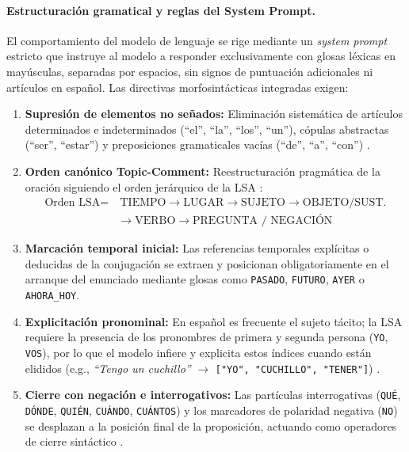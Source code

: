 \paragraph{Estructuración gramatical y reglas del System Prompt.}
El comportamiento del modelo de lenguaje se rige mediante un \textit{system prompt} estricto que instruye al modelo a responder exclusivamente con glosas léxicas en mayúsculas, separadas por espacios, sin signos de puntuación adicionales ni artículos en español. Las directivas morfosintácticas integradas exigen:
\begin{enumerate}
    \item \textbf{Supresión de elementos no señados:} Eliminación sistemática de artículos determinados e indeterminados (``el'', ``la'', ``los'', ``un''), cópulas abstractas (``ser'', ``estar'') y preposiciones gramaticales vacías (``de'', ``a'', ``con'') \parencite{massone2012curso}.
    \item \textbf{Orden canónico Topic-Comment:} Reestructuración pragmática de la oración siguiendo el orden jerárquico de la LSA \parencite{massone2012curso}:
    \begin{equation}
    \begin{aligned}
        \text{Orden LSA} = &\ \text{TIEMPO} \longrightarrow \text{LUGAR} \longrightarrow \text{SUJETO} \longrightarrow \text{OBJETO/SUST.} \\
        &\longrightarrow \text{VERBO} \longrightarrow \text{PREGUNTA / NEGACIÓN}
    \end{aligned}
    \end{equation}
    \item \textbf{Marcación temporal inicial:} Las referencias temporales explícitas o deducidas de la conjugación se extraen y posicionan obligatoriamente en el arranque del enunciado mediante glosas como \texttt{PASADO}, \texttt{FUTURO}, \texttt{AYER} o \texttt{AHORA\_HOY}.
    \item \textbf{Explicitación pronominal:} En español es frecuente el sujeto tácito; la LSA requiere la presencia de los pronombres de primera y segunda persona (\texttt{YO}, \texttt{VOS}), por lo que el modelo infiere y explicita estos índices cuando están elididos (e.g., \textit{``Tengo un cuchillo''} $\rightarrow$ \texttt{["YO", "CUCHILLO", "TENER"]}) \parencite{massone1993numero}.
    \item \textbf{Cierre con negación e interrogativos:} Las partículas interrogativas (\texttt{QUÉ}, \texttt{DÓNDE}, \texttt{QUIÉN}, \texttt{CUÁNDO}, \texttt{CUÁNTOS}) y los marcadores de polaridad negativa (\texttt{NO}) se desplazan a la posición final de la proposición, actuando como operadores de cierre sintáctico \parencite{massone2012curso}.
\end{enumerate}

